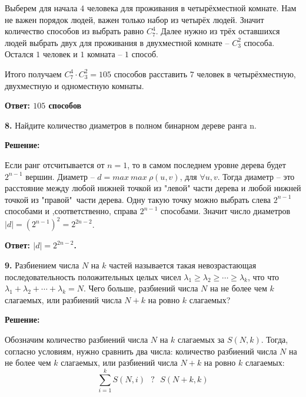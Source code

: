 \documentclass[a4paper,12pt]{article} %
\begin{document}
Выберем для начала $4$ человека для проживания в четырёхместной комнате. Нам не важен порядок людей, важен только набор из четырёх людей. Значит количество способов из выбрать равно $C^4_7$. Далее нужно из трёх оставшихся людей выбрать двух для проживания в двухместной комнате -- $C^2_3$ способа. Остался $1$ человек и $1$ комната -- $1$ способ.

Итого получаем $C^4_7 \cdot C^2_3 = 105$  способов расставить $7$ человек в четырёхместную, двухместную и одноместную комнаты.


\begin{flushright}
\begin{large}
\textbf {Ответ: $105$ способов}
\end{large}
\end{flushright}

{\bf 8.} Найдите количество диаметров в полном бинарном дереве ранга n.
\begin{center}
\bfseries
{\Large Решение: }
\end{center}

Если ранг отсчитывается от $ n = 1$, то в самом последнем уровне дерева будет $2^{n-1}$ вершин. Диаметр -- $d = max\  max\ \rho (u,v)$, для $\forall u,v$. Тогда диаметр -- это расстояние между любой нижней точкой из "левой"\hspace{1mm} части дерева и любой нижней точкой из "правой"\  части дерева. Одну такую точку можно выбрать слева $2^{n-1}$ способами и ,соответственно, справа $2^{n-1}$ способами. Значит число диаметров $|d| = (2^{n-1})^2 = 2^{2n-2}$.

\begin{flushright}
\begin{large}
\textbf {Ответ: $|d| = 2^{2n-2}$.}
\end{large}
\end{flushright}

{\bf 9.} Разбиением числа $N$ на $k$ частей называется такая невозрастающая
последовательность положительных целых чисел $\lambda_1 \geqslant \lambda_2 \geqslant \cdots \geqslant \lambda_k$, что
что $\lambda_1 + \lambda_2 +\cdots +\lambda_k = N$. Чего больше, разбиений числа $N$ на не более
чем $k$ слагаемых, или разбиений числа $N + k$ на ровно $k$ слагаемых?

\begin{center}
\bfseries
{\Large Решение: }
\end{center}

Обозначим количество разбиений числа $N$ на $k$ слагаемых за $S(N,k)$. Тогда, согласно условиям, нужно сравнить два числа: количество разбиений числа $N$ на не более
чем $k$ слагаемых, или разбиений числа $N + k$ на ровно $k$ слагаемых:
\[\sum_{i=1}^k S(N,i) \text{ }?\text{ } S(N+k,k)\]
\end{document}
